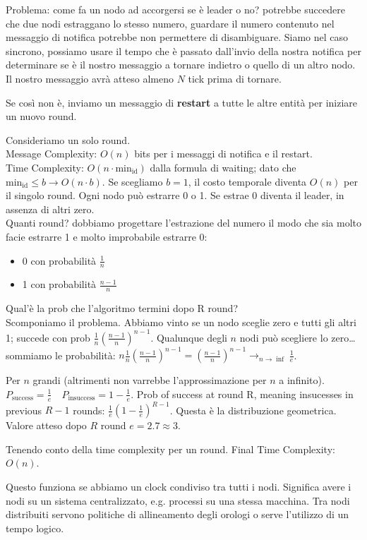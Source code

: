 Problema: come fa un nodo ad accorgersi se è leader o no? potrebbe succedere che due nodi estraggano lo stesso numero, guardare il numero
contenuto nel messaggio di notifica potrebbe non permettere di disambiguare. Siamo nel caso sincrono, possiamo usare il tempo che è
passato dall'invio della nostra notifica per determinare se è il nostro messaggio a tornare indietro o quello di un altro nodo.
Il nostro messaggio avrà atteso almeno $N$ tick prima di tornare.

Se così non è, inviamo un messaggio di \textbf{restart} a tutte le altre entità per iniziare un nuovo round.

Consideriamo un solo round.\\
Message Complexity: $O(n)$ bits per i messaggi di notifica e il restart.\\
Time Complexity: $O(n \cdot \text{min}_\text{id})$ dalla formula di waiting; dato che $\text{min}_\text{id} \leq b \rightarrow O(n \cdot b)$.
Se scegliamo $b=1$, il costo temporale diventa $O(n)$ per il singolo round.
Ogni nodo può estrarre 0 o 1. Se estrae 0 diventa il leader, in assenza di altri zero. \\
Quanti round? dobbiamo progettare l'estrazione del numero il modo che sia molto facie estrarre 1 e molto improbabile estrarre 0:
\begin{itemize}
  \item 0 con probabilità $\frac{1}{n}$
  \item 1 con probabilità $\frac{n-1}{n}$
\end{itemize}

Qual'è la prob che l'algoritmo termini dopo R round? \\
Scomponiamo il problema. Abbiamo vinto se un nodo sceglie zero e tutti gli altri 1; succede con prob $\frac{1}{n} (\frac{n-1}{n})^{n-1}$.
Qualunque degli $n$ nodi può scegliere lo zero\dots sommiamo le probabilità: $n \frac{1}{n} (\frac{n-1}{n})^{n-1} = (\frac{n-1}{n})^{n-1} \rightarrow_{n \rightarrow \inf} \frac{1}{e}$.

Per $n$ grandi (altrimenti non varrebbe l'approssimazione per $n$ a infinito). $P_\text{success} = \frac{1}{e} \quad P_\text{insuccess} = 1 - \frac{1}{e}$.
Prob of success at round R, meaning insucesses in previous $R-1$ rounds: $\frac{1}{e} (1 - \frac{1}{e})^{R-1}$.
Questa è la distribuzione geometrica. Valore atteso dopo $R$ round $e = 2.7 \approx 3$.

Tenendo conto della time complexity per un round. Final Time Complexity: $O(n)$.

Questo funziona se abbiamo un clock condiviso tra tutti i nodi. Significa avere i nodi su un sistema centralizzato, e.g. processi su una
stessa macchina. Tra nodi distribuiti servono politiche di allineamento degli orologi o serve l'utilizzo di un tempo logico.
